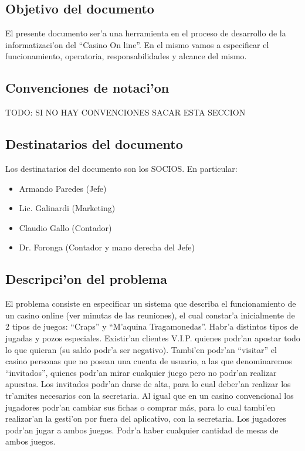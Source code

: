 \subsection{ Objetivo del documento }

El presente documento ser'a una herramienta en el proceso 
de desarrollo de la informatizaci'on del ``Casino On line''. En el mismo 
vamos a especificar el funcionamiento, operatoria, responsabilidades y alcance
del mismo.


\subsection{ Convenciones de notaci'on	}
TODO: SI NO HAY CONVENCIONES SACAR ESTA SECCION

\subsection{ Destinatarios del documento	}
Los destinatarios del documento son los SOCIOS. En particular:

\begin{itemize}
    \item Armando Paredes (Jefe)
    \item Lic. Galinardi (Marketing)
    \item Claudio Gallo (Contador)
    \item Dr. Foronga (Contador y mano derecha del Jefe)
\end{itemize}


\subsection{ Descripci'on del problema }
El problema consiste en especificar un sistema que describa el funcionamiento
de un casino online (ver minutas de las reuniones), el cual constar'a inicialmente de 2 tipos de juegos: ``Craps'' y ``M'aquina Tragamonedas''. Habr'a distintos tipos de jugadas y pozos especiales. Existir'an clientes V.I.P. quienes podr'an apostar todo lo que quieran (su saldo podr'a ser negativo). Tambi'en podr'an ``visitar'' el casino personas que no posean una cuenta de usuario, a las que denominaremos ``invitados'', quienes podr'an mirar cualquier juego pero no podr'an realizar apuestas. Los invitados podr'an darse de alta, para lo cual deber'an realizar los tr'amites necesarios con la secretaria. Al igual que en un casino convencional los jugadores podr'an cambiar sus fichas o comprar más, para lo cual tambi'en realizar'an la gesti'on por fuera del aplicativo, con la secretaria.
Los jugadores podr'an jugar a ambos juegos. Podr'a haber cualquier cantidad de mesas de ambos
juegos.


